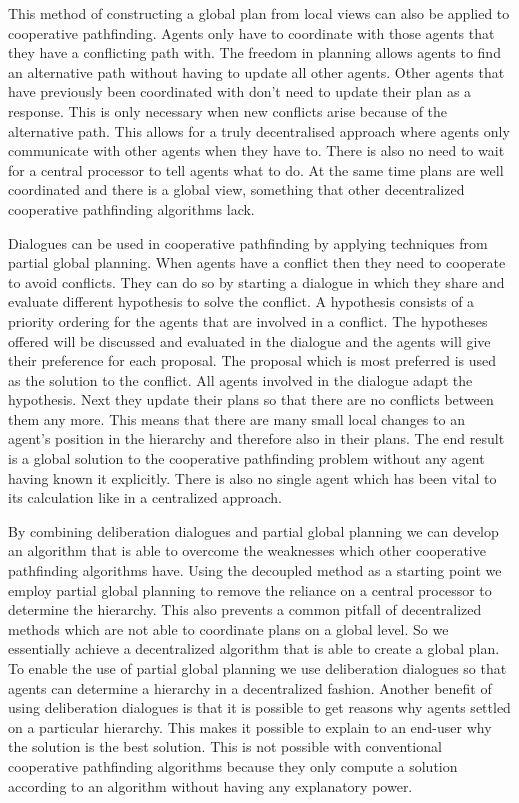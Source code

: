 This method of constructing a global plan from local views can also be applied
to cooperative pathfinding. Agents only have to coordinate with those agents
that they have a conflicting path with. The freedom in planning allows agents
to find an alternative path without having to update all other agents. Other
agents that have previously been coordinated with don't need to update their
plan as a response. This is only necessary when new conflicts arise because of
the alternative path. This allows for a truly decentralised approach where
agents  only communicate with other agents when they have to. There is also no
need to wait for a central processor to tell agents what to do. At the same
time plans are well coordinated and there is a global view, something that other
decentralized cooperative pathfinding algorithms lack.

Dialogues can be used in cooperative pathfinding by applying techniques from
partial global planning. When agents have a conflict then they need to
cooperate to avoid conflicts. They can do so by starting a dialogue in which
they share and evaluate different hypothesis to solve the conflict. A
hypothesis consists of a priority ordering for the agents that are involved in
a conflict. The hypotheses offered will be discussed and evaluated in the
dialogue and the agents will give their preference for each proposal. The
proposal which is most preferred is used as the solution to the conflict. All
agents involved in the dialogue adapt the hypothesis. Next they update their
plans so that there are no conflicts between them any more. This means that
there are many small local changes to an agent's position in the hierarchy and
therefore also in their plans. The end result is a global solution to the
cooperative pathfinding problem without any agent having known it explicitly.
There is also no single agent which has been vital to its calculation like in a
centralized approach.

By combining deliberation dialogues and partial global planning we can develop
an algorithm that is able to overcome the weaknesses which other cooperative
pathfinding algorithms have. Using the decoupled method as a starting point we
employ partial global planning to remove the reliance on a central processor to
determine the hierarchy. This also prevents a common pitfall of decentralized
methods which are not able to coordinate plans on a global level. So we
essentially achieve a decentralized algorithm that is able to create a global
plan. To enable the use of partial global planning we use deliberation
dialogues so that agents can determine a hierarchy in a decentralized fashion.
Another benefit of using deliberation dialogues is that it is possible to get
reasons why agents settled on a particular hierarchy. This makes it possible to
explain to an end-user why the solution is the best solution. This is not
possible with conventional cooperative pathfinding algorithms because they only
compute a solution according to an algorithm without having any explanatory
power.

